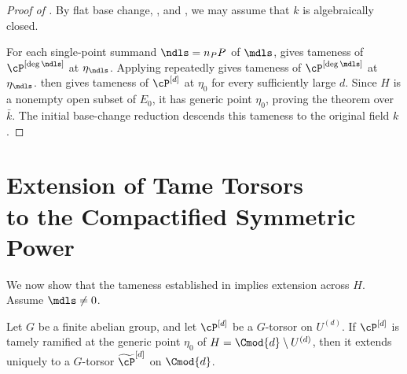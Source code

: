 \begin{proof}[Proof of ]
By flat base change, , and
, we may assume
that $k$ is algebraically closed.

For each single-point summand $\ndls=n_P P$ of $\mdls$,
 gives tameness of
$\cP^{[\deg\ndls]}$ at $\eta_\ndls$. Applying
 repeatedly gives tameness of
$\cP^{[\deg\mdls]}$ at $\eta_\mdls$.
 then gives tameness of
$\cP^{[d]}$ at $\eta_0$ for every sufficiently large $d$. Since $H$ is a
nonempty open subset of $E_0$, it has generic point $\eta_0$, proving
the theorem over $\bar{k}$. The initial base-change reduction descends this
tameness to the original field $k$.
\end{proof}

\section[Extension of Tame Torsors to the Compactified Symmetric Power]{\texorpdfstring{Extension of Tame Torsors\\to the Compactified Symmetric Power}{Extension of Tame Torsors to the Compactified Symmetric Power}}\label{section:extension-across-boundary}

We now show that the tameness established in
 implies extension
across $H$. Assume $\mdls\ne0$.

\begin{lemma}\label{lemma:ExtensionOfTamelyRamifiedSheaf}
Let $G$ be a finite abelian group, and let $\cP^{[d]}$ be a
$G$-torsor on $U^{(d)}$. If $\cP^{[d]}$ is tamely ramified at the generic
point $\eta_0$ of $H=\Cmod{d}\setminus U^{(d)}$, then it extends uniquely
to a $G$-torsor $\widetilde{\cP}^{[d]}$ on $\Cmod{d}$.
\end{lemma}

